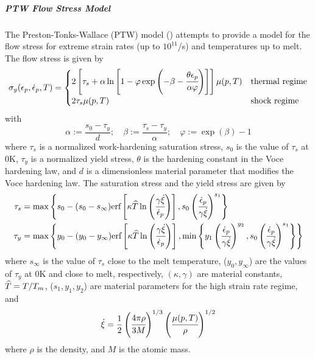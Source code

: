   \subparagraph{PTW Flow Stress Model}
  The Preston-Tonks-Wallace (PTW) model (\cite{Preston03}) attempts to
  provide a model for the flow stress for extreme strain rates
  (up to $10^{11}$/s) and temperatures up to melt.  The flow stress is
  given by
  \begin{equation}
    \sigma_y(\epsilon_p,\dot{\epsilon}_{p},T) = 
       \begin{cases}
         2\left[\tau_s + \alpha\ln\left[1 - \varphi
          \exp\left(-\beta-\cfrac{\theta\epsilon_p}{\alpha\varphi}\right)\right]\right]
         \mu(p,T) & \text{thermal regime} \\
         2\tau_s\mu(p,T) & \text{shock regime}
       \end{cases}
  \end{equation}
  with
  \begin{equation}
    \alpha := \frac{s_0 - \tau_y}{d}; \quad
    \beta := \frac{\tau_s - \tau_y}{\alpha}; \quad
    \varphi := \exp(\beta) - 1
  \end{equation}
  where $\tau_s$ is a normalized work-hardening saturation stress,
  $s_0$ is the value of $\tau_s$ at 0K,
  $\tau_y$ is a normalized yield stress, $\theta$ is the hardening constant
  in the Voce hardening law, and $d$ is a dimensionless material
  parameter that modifies the Voce hardening law.  The saturation stress
  and the yield stress are given by
  \begin{align}
    \tau_s & = \max\left\{s_0 - (s_0 - s_{\infty})
       \text{erf}\left[\kappa
         \widehat{T}\ln\left(\cfrac{\gamma\dot{\xi}}{\dot{\epsilon}_{p}}\right)\right],
       s_0\left(\cfrac{\dot{\epsilon}_{p}}{\gamma\dot{\xi}}\right)^{s_1}\right\} \\
    \tau_y & = \max\left\{y_0 - (y_0 - y_{\infty})
       \text{erf}\left[\kappa
         \widehat{T}\ln\left(\cfrac{\gamma\dot{\xi}}{\dot{\epsilon}_{p}}\right)\right],
       \min\left\{
         y_1\left(\cfrac{\dot{\epsilon}_{p}}{\gamma\dot{\xi}}\right)^{y_2}, 
         s_0\left(\cfrac{\dot{\epsilon}_{p}}{\gamma\dot{\xi}}\right)^{s_1}\right\}\right\} 
  \end{align}
  where $s_{\infty}$ is the value of $\tau_s$ close to the melt temperature,
  ($y_0, y_{\infty}$) are the values of $\tau_y$ at 0K and close to melt,
  respectively, $(\kappa, \gamma)$ are material constants, $\widehat{T} = T/T_m$,
  ($s_1, y_1, y_2$) are material parameters for the high strain rate
  regime, and
  \begin{equation}
    \dot{\xi} = \frac{1}{2}\left(\cfrac{4\pi\rho}{3M}\right)^{1/3}
             \left(\cfrac{\mu(p,T)}{\rho}\right)^{1/2}
  \end{equation}
  where $\rho$ is the density, and $M$ is the atomic mass.

